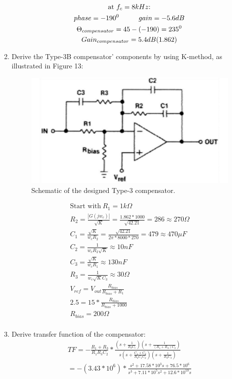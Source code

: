 \documentclass{article}
\newcommand\tab[1][1cm]{\hspace*{#1}}
\begin{document}
\begin{enumerate}
\begin{gather*}
    \text{at $f_c=8kHz$:}\\
    phase=-190^0 \tab gain=-5.6dB\\
    \Theta_{compensator}=45-(-190)=235^0\\
    Gain_{compensator}=5.4dB(1.862)
\end{gather*}
\item Derive the Type-3B compensator' components by using K-method, as illustrated in Figure 13:
 \begin{figure}[H]
    \centering
    \includegraphics[scale=0.5]{Type-3.png}
    \caption{Schematic of the designed Type-3 compensator.}
    \label{fig:my_label}
\end{figure}

\begin{gather*}
    \text{Start with} \: R_1=1k\Omega\\
    R_2=\frac{|G(jw_{c})|}{\sqrt{K}}=\frac{1.862*1000}{\sqrt{42.21}}=286\approx 270\Omega\\
    C_1=\frac{\sqrt{K}}{w_cR_2}=\frac{\sqrt{42.21}}{2\pi*8000*270}=479\approx470\mu F\\
    C_2= \frac{1}{w_cR_2\sqrt{K}}\approx10nF\\
    C_3=\frac{\sqrt{K}}{w_cR_1}\approx130nF\\
    R_3=\frac{1}{w_c\sqrt{K}C_3}\approx30\Omega\\
    V_{ref}=V_{out}\frac{R_{bias}}{R_{bias}+R_1}\\
    2.5=15*\frac{R_{bias}}{R_{bias}+1000}\\
    R_{bias}=200\Omega\\
\end{gather*}
\item Derive transfer function of the compensator: 
\begin{gather*}
    TF=-\frac{R_1+R_3}{R_1R_3C_2}*\frac{(s+\frac{1}{R_2C_1})(s+\frac{1}{(R_1+R_3)C_3})}{s(s+\frac{C_1+C_2}{R_2C_1C_2})(s+\frac{1}{R_3C_3})}\\
    =-(3.43*10^6)*\frac{s^2+17.58*10^3s+76.5*10^6}{s^3+7.11*10^5s^2+12.6*10^10s}\\
\end{gather*}

\end{enumerate}
\end{document}
